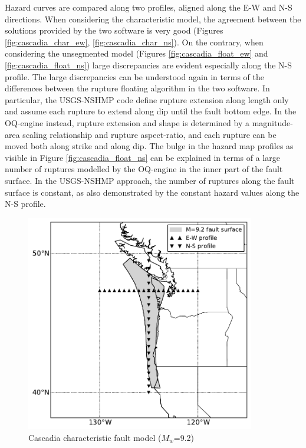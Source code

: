 Hazard curves are compared along two profiles, aligned along the E-W and N-S directions. When considering the characteristic model, the agreement between the solutions provided by the two software is very good (Figures \ref{fig:cascadia_char_ew}, \ref{fig:cascadia_char_ns}). On the contrary, when considering the unsegmented model (Figures \ref{fig:cascadia_float_ew} and \ref{fig:cascadia_float_ns}) large discrepancies are evident especially along the N-S profile. The large discrepancies can be understood again in terms of the differences between the rupture floating algorithm in the two software. In particular, the USGS-NSHMP code define rupture extension along length only and assume each rupture to extend along dip until the fault bottom edge. In the OQ-engine instead, rupture extension and shape is determined by a magnitude-area scaling relationship and rupture aspect-ratio, and each rupture can be moved both along strike and along dip. The bulge in the hazard map profiles as visible in Figure \ref{fig:cascadia_float_ns} can be explained in terms of a large number of ruptures modelled by the OQ-engine in the inner part of the fault surface. In the USGS-NSHMP approach, the number of ruptures along the fault surface is constant, as also demonstrated by the constant hazard values along the N-S profile.
\begin{figure}
\centering
\includegraphics[width=10cm]{./qareport/pictures/cascadia_char.pdf}
\caption{Cascadia characteristic fault model ($M_{w}$=9.2)}
\label{fig:cascadia_geo}
\end{figure}


